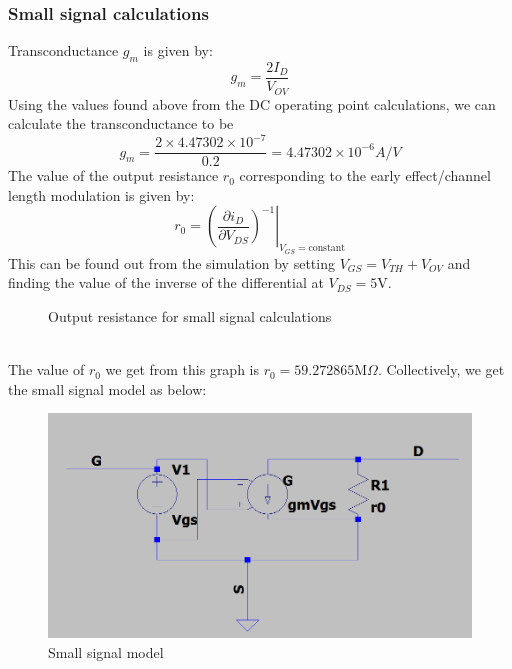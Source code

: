 \documentclass{report}[12pt]
\begin{document}
\subsubsection*{Small signal calculations}
Transconductance $g_m$ is given by:
$$g_m=\frac{2I_D}{V_{OV}}$$
Using the values found above from the DC operating point calculations, we can calculate the transconductance to be
$$g_m=\frac{2\times4.47302\times10^{-7}}{0.2}=4.47302\times10^{-6}A/V$$
The value of the output resistance $r_0$ corresponding to the early effect/channel length modulation is given by:
$$r_0=\left(\left.\frac{\partial i_D}{\partial V_{DS}}\right)^{-1}\right|_{V_{GS}=\mathrm{constant}}$$
This can be found out from the simulation by setting $V_{GS}=V_{TH}+V_{OV}$ and finding the value of the inverse of the differential at $V_{DS}=5$V.
\begin{figure}[ht]
    \centering
    \caption{Output resistance for small signal calculations}
    \label{fig:r0}
\end{figure}\\
The value of $r_0$ we get from this graph is $r_0=59.272865\mathrm{M}\Omega$.
Collectively, we get the small signal model as below:
\begin{figure}[ht]
    \centering
    \includegraphics[scale=0.35]{resources/ssmodel.png}
    \caption{Small signal model}
    \label{fig:small_signal}
\end{figure}
\newpage
\end{document}
